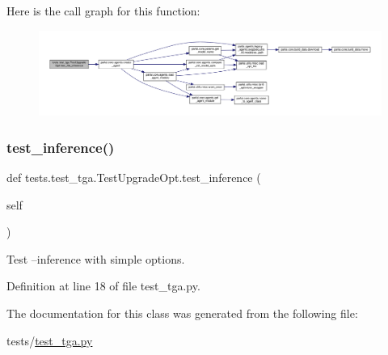 Here is the call graph for this function\+:
\nopagebreak
\begin{figure}[H]
\begin{center}
\leavevmode
\includegraphics[width=350pt]{classtests_1_1test__tga_1_1TestUpgradeOpt_a8ba19a5f6b229d7f34a3a8ac022e211b_cgraph}
\end{center}
\end{figure}
\mbox{\label{classtests_1_1test__tga_1_1TestUpgradeOpt_acaefe84187dab5f848fa33afae999144}} 
\subsubsection{\texorpdfstring{test\+\_\+inference()}{test\_inference()}}
{\footnotesize\ttfamily def tests.\+test\+\_\+tga.\+Test\+Upgrade\+Opt.\+test\+\_\+inference (\begin{DoxyParamCaption}\item[{}]{self }\end{DoxyParamCaption})}

\begin{DoxyVerb}Test --inference with simple options.\end{DoxyVerb}
 

Definition at line 18 of file test\+\_\+tga.\+py.



The documentation for this class was generated from the following file\+:\begin{DoxyCompactItemize}
\item 
tests/\hyperlink{test__tga_8py}{test\+\_\+tga.\+py}\end{DoxyCompactItemize}
